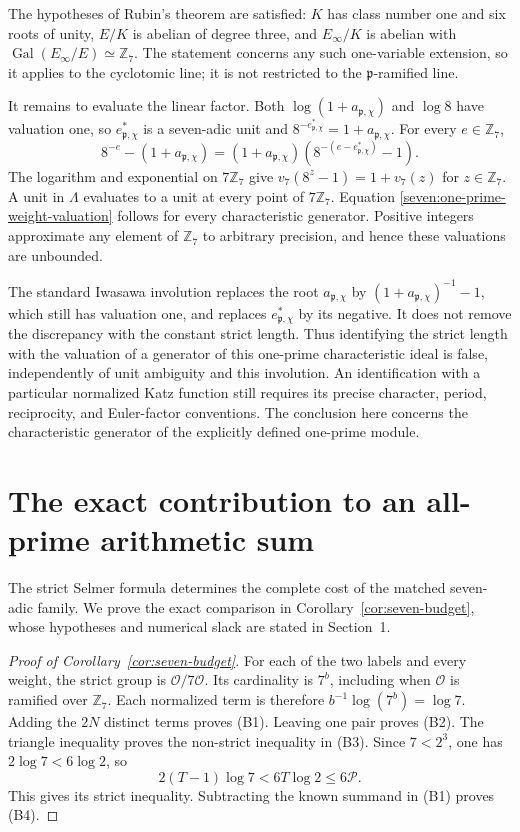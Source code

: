 \documentclass[11pt]{article}
\newcommand{\Z}{\mathbb Z}\newcommand{\Q}{\mathbb Q}
\begin{document}
The hypotheses of Rubin's theorem are satisfied: $K$ has class
number one and six roots of unity, $E/K$ is abelian of degree three,
and $E_\infty/K$ is abelian with
$\operatorname{Gal}(E_\infty/E)\simeq\mathbb Z_7$.
The statement concerns any such one-variable extension, so it
applies to the cyclotomic line; it is not restricted to the
$\mathfrak p$-ramified line.

It remains to evaluate the linear factor. Both
$\log(1+a_{\mathfrak p,\chi})$ and $\log8$ have valuation one, so
$e_{\mathfrak p,\chi}^{*}$ is a seven-adic unit and
$8^{-e_{\mathfrak p,\chi}^{*}}=1+a_{\mathfrak p,\chi}$.
For every $e\in\mathbb Z_7$,
\[
 8^{-e}-(1+a_{\mathfrak p,\chi})
 =(1+a_{\mathfrak p,\chi})
   \left(8^{-(e-e_{\mathfrak p,\chi}^{*})}-1\right).
\]
The logarithm and exponential on $7\mathbb Z_7$ give
$v_7(8^z-1)=1+v_7(z)$ for $z\in\mathbb Z_7$.
A unit in $\Lambda$ evaluates to a unit at every point of
$7\mathbb Z_7$. Equation
\eqref{seven:one-prime-weight-valuation} follows for every
characteristic generator.
Positive integers approximate any element of $\mathbb Z_7$ to
arbitrary precision, and hence these valuations are unbounded.

The standard Iwasawa involution replaces the root
$a_{\mathfrak p,\chi}$ by
$(1+a_{\mathfrak p,\chi})^{-1}-1$, which still has valuation one,
and replaces $e_{\mathfrak p,\chi}^{*}$ by its negative.
It does not remove the discrepancy with the constant strict length.
Thus identifying the strict length with the valuation of a generator
of this one-prime characteristic ideal is false, independently of
unit ambiguity and this involution.
An identification with a particular normalized Katz function still
requires its precise character, period, reciprocity, and Euler-factor
conventions. The conclusion here concerns the characteristic
generator of the explicitly defined one-prime module.

\section{The exact contribution to an all-prime arithmetic sum}
The strict Selmer formula determines the complete cost of the matched seven-adic family. We prove the exact comparison in Corollary~\ref{cor:seven-budget}, whose hypotheses and numerical slack are stated in Section~1.


\begin{proof}[Proof of Corollary~\ref{cor:seven-budget}]
For each of the two labels and every weight, the strict group is $\mathcal O/7\mathcal O$. Its cardinality is $7^b$, including when $\mathcal O$ is ramified over $\Z_7$. Each normalized term is therefore
$b^{-1}\log(7^b)=\log7$. Adding the $2N$ distinct terms proves (B1). Leaving one pair proves (B2). The triangle inequality proves the non-strict inequality in (B3). Since $7<2^3$, one has $2\log7<6\log2$, so
\[
2(T-1)\log7<6T\log2\le6\mathcal P.
\]
This gives its strict inequality. Subtracting the known summand in (B1) proves (B4).
\end{proof}
\end{document}
